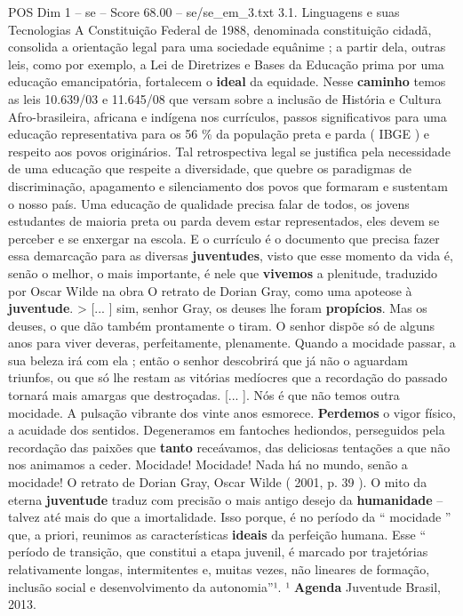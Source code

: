 \begin{textsample}{POS Dim 1 – se – Score 68.00 – se/se\_em\_3.txt}  \label{ex:f1_pos_081}
3.1.
Linguagens e suas Tecnologias A Constituição Federal de 1988, denominada constituição cidadã, consolida a orientação legal para uma sociedade equânime ; a partir dela, outras leis, como por exemplo, a Lei de Diretrizes e Bases da Educação prima por uma educação emancipatória, fortalecem o \textbf{ideal} da equidade.
Nesse \textbf{caminho} temos as leis 10.639/03 e 11.645/08 que versam sobre a inclusão de História e Cultura Afro-brasileira, africana e indígena nos currículos, passos significativos para uma educação representativa para os 56 \% da população preta e parda ( IBGE ) e respeito aos povos originários.
Tal retrospectiva legal se justifica pela necessidade de uma educação que respeite a diversidade, que quebre os paradigmas de discriminação, apagamento e silenciamento dos povos que formaram e sustentam o nosso país.
Uma educação de qualidade precisa falar de todos, os jovens estudantes de maioria preta ou parda devem estar representados, eles devem se perceber e se enxergar na escola.
E o currículo é o documento que precisa fazer essa demarcação para as diversas \textbf{juventudes}, visto que esse momento da vida é, senão o melhor, o mais importante, é nele que \textbf{vivemos} a plenitude, traduzido por Oscar Wilde na obra O retrato de Dorian Gray, como uma apoteose à \textbf{juventude}. > [... ] sim, senhor Gray, os deuses lhe foram \textbf{propícios}.
Mas os deuses, o que dão também prontamente o tiram.
O senhor dispõe só de alguns anos para viver deveras, perfeitamente, plenamente.
Quando a mocidade passar, a sua beleza irá com ela ; então o senhor descobrirá que já não o aguardam triunfos, ou que só lhe restam as vitórias medíocres que a recordação do passado tornará mais amargas que destroçadas. [... ].
Nós é que não temos outra mocidade.
A pulsação vibrante dos vinte anos esmorece. \textbf{Perdemos} o vigor físico, a acuidade dos sentidos.
Degeneramos em fantoches hediondos, perseguidos pela recordação das paixões que \textbf{tanto} receávamos, das deliciosas tentações a que não nos animamos a ceder.
Mocidade!
Mocidade!
Nada há no mundo, senão a mocidade!
O retrato de Dorian Gray, Oscar Wilde ( 2001, p. 39 ).
O mito da eterna \textbf{juventude} traduz com precisão o mais antigo desejo da \textbf{humanidade} – talvez até mais do que a imortalidade.
Isso porque, é no período da “ mocidade ” que, a priori, reunimos as características \textbf{ideais} da perfeição humana.
Esse “ período de transição, que constitui a etapa juvenil, é marcado por trajetórias relativamente longas, intermitentes e, muitas vezes, não lineares de formação, inclusão social e desenvolvimento da autonomia”¹. ¹ \textbf{Agenda} Juventude Brasil, 2013.

\end{textsample}
